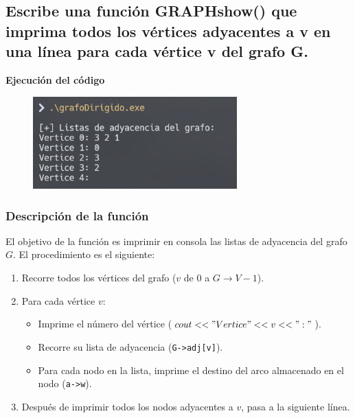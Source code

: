 \documentclass{article}
\begin{document}
    \subsection{Escribe una función GRAPHshow() que imprima todos los vértices adyacentes a v en una línea para cada vértice v del grafo G.}

        

        \textbf{Ejecución del código}
            \begin{figure}[H]
            	\centering
             	\includegraphics[width=0.7\textwidth,keepaspectratio]{img/exercise4.png}
            \end{figure}

        \subsubsection*{Descripción de la función}
            El objetivo de la función es imprimir en consola las listas de adyacencia del grafo \( G \). El procedimiento es el siguiente:
            \begin{enumerate}
                \item Recorre todos los vértices del grafo (\( v \) de \( 0 \) a \( G\rightarrow V - 1 \)).
                \item Para cada vértice \( v \):
                \begin{itemize}
                    \item Imprime el número del vértice (\texttt{\(cout << "Vertice " << v << ":"\)}).
                    \item Recorre su lista de adyacencia (\texttt{G->adj[v]}).
                    \item Para cada nodo en la lista, imprime el destino del arco almacenado en el nodo (\texttt{a->w}).
                \end{itemize}
                \item Después de imprimir todos los nodos adyacentes a \( v \), pasa a la siguiente línea.
            \end{enumerate}
            
\end{document}
